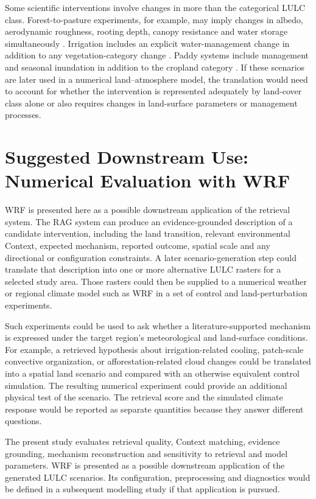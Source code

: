 \documentclass[10pt,twocolumn]{article}
\begin{document}
Some scientific interventions involve changes in more than the categorical LULC class. Forest-to-pasture experiments, for example, may imply changes in albedo, aerodynamic roughness, rooting depth, canopy resistance and water storage simultaneously \cite{shukla1990}. Irrigation includes an explicit water-management change in addition to any vegetation-category change \cite{thiery2020}. Paddy systems include management and seasonal inundation in addition to the cropland category \cite{weng2025}. If these scenarios are later used in a numerical land--atmosphere model, the translation would need to account for whether the intervention is represented adequately by land-cover class alone or also requires changes in land-surface parameters or management processes.

\section{Suggested Downstream Use: Numerical Evaluation with WRF}
\label{sec:wrf_future}

WRF is presented here as a possible downstream application of the retrieval system. The RAG system can produce an evidence-grounded description of a candidate intervention, including the land transition, relevant environmental Context, expected mechanism, reported outcome, spatial scale and any directional or configuration constraints. A later scenario-generation step could translate that description into one or more alternative LULC rasters for a selected study area. Those rasters could then be supplied to a numerical weather or regional climate model such as WRF in a set of control and land-perturbation experiments.

Such experiments could be used to ask whether a literature-supported mechanism is expressed under the target region's meteorological and land-surface conditions. For example, a retrieved hypothesis about irrigation-related cooling, patch-scale convective organization, or afforestation-related cloud changes could be translated into a spatial land scenario and compared with an otherwise equivalent control simulation. The resulting numerical experiment could provide an additional physical test of the scenario. The retrieval score and the simulated climate response would be reported as separate quantities because they answer different questions.

The present study evaluates retrieval quality, Context matching, evidence grounding, mechanism reconstruction and sensitivity to retrieval and model parameters. WRF is presented as a possible downstream application of the generated LULC scenarios. Its configuration, preprocessing and diagnostics would be defined in a subsequent modelling study if that application is pursued.
\end{document}
